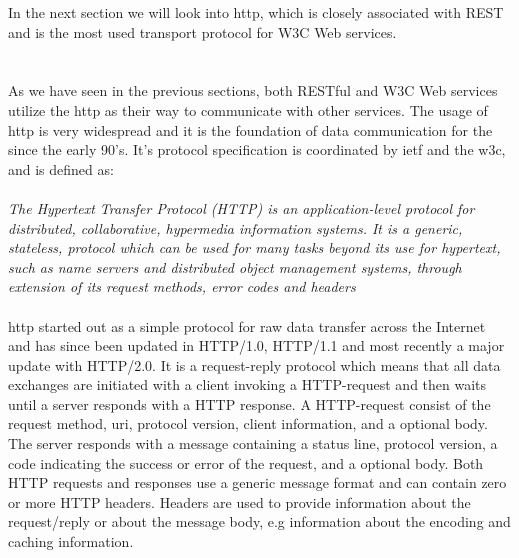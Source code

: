  In the next section we will look into \gls{http}, which is closely associated
 with REST and is the most used transport protocol for W3C Web services.

\section{}

As we have seen in the previous sections, both RESTful and W3C Web services
utilize the \gls{http} as their way to communicate with other services. The
usage of \gls{http} is very widespread and it is the foundation of data
communication for the  since the early 90's. It's protocol
specification is coordinated by \gls{ietf} and the \gls{w3c}, and is defined
as\cite{rfc-2616}:

\paragraph{}
\textit{
    The Hypertext Transfer Protocol (HTTP) is an application-level
    protocol for distributed, collaborative, hypermedia information
    systems. It is a generic, stateless, protocol which can be used for
    many tasks beyond its use for hypertext, such as name servers and
    distributed object management systems, through extension of its
    request methods, error codes and headers
}

\paragraph{}

\gls{http} started out as a simple protocol for raw data transfer across the
Internet and has since been updated in HTTP/1.0, HTTP/1.1 and most recently a
major update with HTTP/2.0. It is a request-reply protocol which means that all
data exchanges are initiated with a client invoking a HTTP-request and then
waits until a server responds with a HTTP response. A HTTP-request consist of
the request method, \gls{uri}, protocol version, client information, and a optional
body. The server responds with a message containing a status line, protocol
version, a code indicating the success or error of the request, and a optional
body. Both HTTP requests and responses use a generic message format and can
contain zero or more HTTP headers. Headers are used to provide information about
the request/reply or about the message body, e.g information about the encoding
and caching information.

